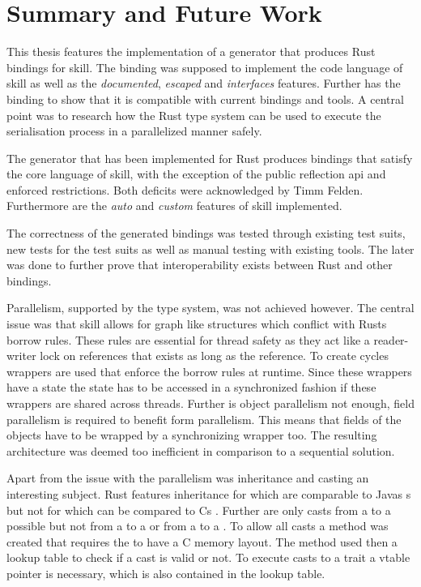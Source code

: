 \documentclass[thesis]{subfiles}
\begin{document}
\chapter{Summary and Future Work}
This thesis features the implementation of a generator that produces Rust bindings for \gls{skill}.
The binding was supposed to implement the code language of \gls{skill} as well as the \emph{documented}, \emph{escaped} and \emph{interfaces} features.
Further has the binding to show that it is compatible with current bindings and tools.
A central point was to research how the Rust type system can be used to execute the serialisation process in a parallelized manner safely.

The generator that has been implemented for Rust produces bindings that satisfy the core language of \gls{skill}, with the exception of the public reflection \gls{api} and  enforced restrictions.
Both deficits were acknowledged by Timm Felden.
Furthermore are the \emph{auto} and \emph{custom} features of \gls{skill} implemented.

The correctness of the generated bindings was tested through existing test suits, new tests for the test suits as well as manual testing with existing tools.
The later was done to further prove that interoperability exists between Rust and other bindings.

Parallelism, supported by the type system, was not achieved however.
The central issue was that \gls{skill} allows for graph like structures which conflict with Rusts borrow rules.
These rules are essential for thread safety as they act like a reader-writer lock on references that exists as long as the reference.
To create cycles wrappers are used that enforce the borrow rules at runtime.
Since these wrappers have a state the state has to be accessed in a synchronized fashion if these wrappers are shared across threads.
Further is object parallelism not enough, field parallelism is required to benefit form parallelism.
This means that fields of the objects have to be wrapped by a synchronizing wrapper too.
The resulting architecture was deemed too inefficient in comparison to a sequential solution.

Apart from the issue with the parallelism was inheritance and casting an interesting subject.
Rust features inheritance for \traits which are comparable to Javas s but not for \structs which can be compared to Cs \structs.
Further are only casts from a \struct to a \trait possible but not from a \trait to a \struct or from a \trait to a \trait.
To allow all casts a method was created that requires the \structs to have a C memory layout.
The method used then a lookup table to check if a cast is valid or not.
To execute casts to a trait a vtable pointer is necessary, which is also contained in the lookup table.
\end{document}
